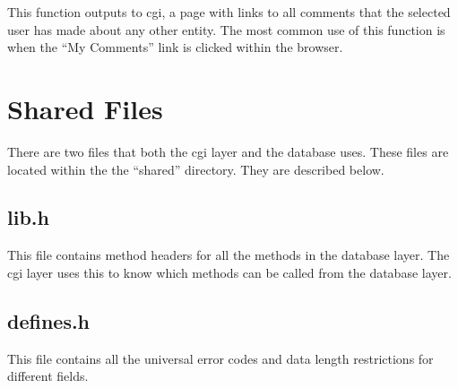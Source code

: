 \documentclass{article}
\begin{document}
This function outputs to cgi, a page with links to all comments that the selected user has made about any other entity. The most common use of this function is when the ``My Comments'' link is clicked within the browser.

\section{Shared Files}
There are two files that both the cgi layer and the database uses. These files are located within the the ``shared'' directory. They are described below.
\subsection{lib.h}
This file contains method headers for all the methods in the database layer. The cgi layer uses this to know which methods can be called from the database layer.
\subsection{defines.h}
This file contains all the universal error codes and data length restrictions for different fields. 
\end{document}
